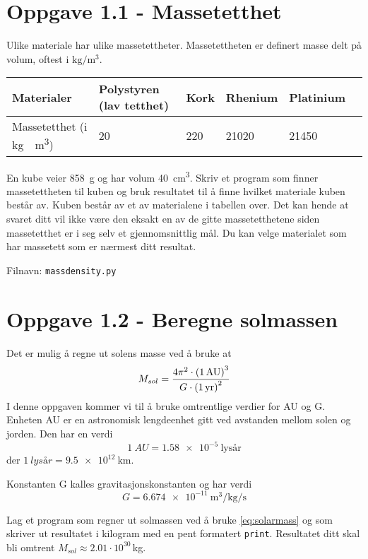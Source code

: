 \documentclass[10pt,a4paper]{article}
\begin{document}
	\section*{Oppgave 1.1 - Massetetthet}
	Ulike materiale har ulike massetettheter. Massetettheten er definert masse delt på volum, oftest i $\mathrm{kg}/\mathrm{m^3}$.   
	\begin{center}
	\begin{tabular}{l | l  l  l  l l}
			Materialer& Polystyren (lav tetthet) & Kork & Rhenium & Platinium \\ \hline 
			Massetetthet (i \si{\kg.\per\cubic\meter}) &20 & 220  & 21020 & 21450
	\end{tabular} 
	\end{center}
	En kube veier \SI{858}{g} og har volum \SI{40}{cm^3}. Skriv et program som finner massetettheten til kuben og bruk resultatet til å finne hvilket materiale kuben består av. 
	Kuben består av et av materialene i tabellen over. Det kan hende at svaret ditt vil ikke være den eksakt en av de gitte massetetthetene siden massetetthet er i seg selv et gjennomsnittlig mål. Du kan velge materialet som har massetett som er nærmest ditt resultat. 
	
	Filnavn: \texttt{massdensity.py} 
	\section*{Oppgave 1.2 - Beregne solmassen}
	Det er mulig å regne ut solens masse ved å bruke at 
	\begin{equation}\label{eq:solarmass}
	M_{sol} = \frac{4\pi^2 \cdot\qty(\SI{1}{AU})^3}{G \cdot \qty(\SI{1}{yr})^2}
	\end{equation}
	I denne oppgaven kommer vi til å bruke omtrentlige verdier for AU og G. \\
	Enheten AU er en astronomisk lengdeenhet gitt ved avstanden mellom solen og jorden. Den har en verdi
	\[
	\SI{1}{AU} = \SI{1.58e-5 }{\text{lysår}}
	\]
	der
	$
	\SI{1}{lysår} = \SI{9.5e12}{\km} 
	$.
	
	Konstanten G kalles gravitasjonskonstanten og har verdi 
	\[
	G = \SI{6.674e-11}{\cubic\meter\per\kg\per\second} 
	\]
 
	Lag et program som regner ut solmassen ved å bruke \vref{eq:solarmass} og som skriver ut resultatet i kilogram med en pent formatert \texttt{print}.  Resultatet ditt skal bli omtrent $M_{sol} \approx 2.01 \cdot 10^{30}\,$kg. 
	
\end{document}
